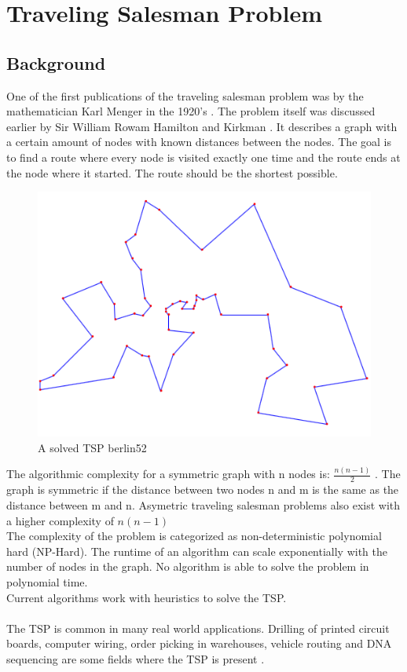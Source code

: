 \chapter{Traveling Salesman Problem}
\label{chap:tsp}
\section{Background}
One of the first publications of the traveling salesman problem was by the mathematician Karl Menger in the 1920's \cite{Applegate}. The problem itself was discussed earlier by Sir William Rowam Hamilton and Kirkman \cite{Matai10}. It describes a graph with a certain amount of nodes with known distances between the nodes. The goal is to find a route where every node is visited exactly one time and the route ends at the node where it started. The route should be the shortest possible.
\begin{figure}[H]
	\includegraphics[]{Images/berlin52.png}
	\caption{A solved TSP berlin52}
	\label{berlin52}
\end{figure}
\newpage
The algorithmic complexity for a symmetric graph with n nodes is: $\frac{n(n-1)}{2}$ \cite{Applegate}.
The graph is symmetric if the distance between two nodes n and m is the same as the distance between m and n. Asymetric traveling salesman problems also exist with a higher complexity of $n(n-1)$\\
The complexity of the problem is categorized as non-deterministic polynomial hard (NP-Hard). The runtime of an algorithm can scale exponentially with the number of nodes in the graph. No algorithm is able to solve the problem in polynomial time.\\
Current algorithms work with heuristics to solve the TSP.\\\\
The TSP is common in many real world applications. Drilling of printed circuit boards, computer wiring, order picking in warehouses, vehicle routing and DNA sequencing are some fields where the TSP is present \cite{Matai10}.
